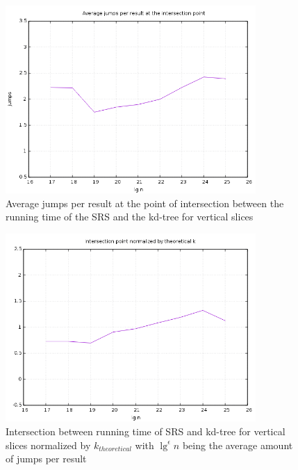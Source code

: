 \begin{figure}[h]
    \centering
    \includegraphics[width = 0.85\textwidth]{pictures/analysis/vert_jumps_per_lgn.png}
    \caption{Average jumps per result at the point of intersection between the running time of the SRS and the kd-tree for vertical slices}\label{fig:vert_jumps_per_lgn}
\end{figure}


\begin{figure}[h]
    \centering
    \includegraphics[width = 0.85\textwidth]{pictures/analysis/vert_theory.png}
    \caption{Intersection between running time of SRS and kd-tree for vertical slices normalized by $k_{theoretical}$ with $\lg^\epsilon n$ being the average amount of jumps per result}\label{fig:vert_theory}
\end{figure}


